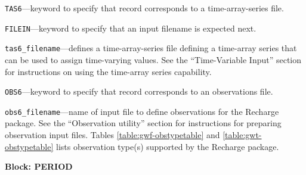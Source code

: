 \begin{description}
\item \texttt{TAS6}---keyword to specify that record corresponds to a time-array-series file.

\item \texttt{FILEIN}---keyword to specify that an input filename is expected next.

\item \texttt{tas6\_filename}---defines a time-array-series file defining a time-array series that can be used to assign time-varying values. See the ``Time-Variable Input'' section for instructions on using the time-array series capability.

\item \texttt{OBS6}---keyword to specify that record corresponds to an observations file.

\item \texttt{obs6\_filename}---name of input file to define observations for the Recharge package. See the ``Observation utility'' section for instructions for preparing observation input files. Tables \ref{table:gwf-obstypetable} and \ref{table:gwt-obstypetable} lists observation type(s) supported by the Recharge package.

\end{description}
\item \textbf{Block: PERIOD}

